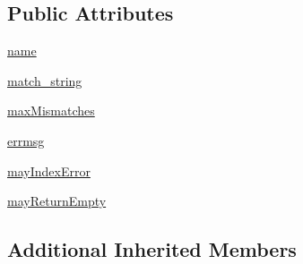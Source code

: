 \subsection*{Public Attributes}
\begin{DoxyCompactItemize}
\item 
\hyperlink{classpkg__resources_1_1__vendor_1_1pyparsing_1_1CloseMatch_a398d363d50cc4108563176c9d65a2f0b}{name}
\item 
\hyperlink{classpkg__resources_1_1__vendor_1_1pyparsing_1_1CloseMatch_acce4c0b39d10c00108a16ab1628ff1aa}{match\+\_\+string}
\item 
\hyperlink{classpkg__resources_1_1__vendor_1_1pyparsing_1_1CloseMatch_a09058c80659100caec3f519c53d274c6}{max\+Mismatches}
\item 
\hyperlink{classpkg__resources_1_1__vendor_1_1pyparsing_1_1CloseMatch_abf7e697fcb785e8fa2346981e1405bcf}{errmsg}
\item 
\hyperlink{classpkg__resources_1_1__vendor_1_1pyparsing_1_1CloseMatch_a642515096d4126c2c59cae20d0db71b1}{may\+Index\+Error}
\item 
\hyperlink{classpkg__resources_1_1__vendor_1_1pyparsing_1_1CloseMatch_a1e2e94f0db0586ca23f0fac8898b3b69}{may\+Return\+Empty}
\end{DoxyCompactItemize}
\subsection*{Additional Inherited Members}



